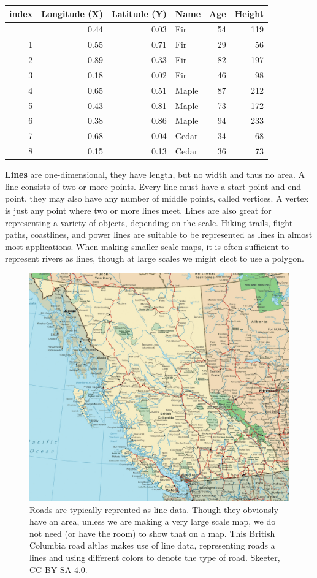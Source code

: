 \documentclass[
]{book}
\begin{document}
\begin{longtable}[]{@{}rrrlrr@{}}
\toprule\noalign{}
index & Longitude (X) & Latitude (Y) & Name & Age & Height \\
\midrule\noalign{}
\endhead
\bottomrule\noalign{}
\endlastfoot
0 & 0.44 & 0.03 & Fir & 54 & 119 \\
1 & 0.55 & 0.71 & Fir & 29 & 56 \\
2 & 0.89 & 0.33 & Fir & 82 & 197 \\
3 & 0.18 & 0.02 & Fir & 46 & 98 \\
4 & 0.65 & 0.51 & Maple & 87 & 212 \\
5 & 0.43 & 0.81 & Maple & 73 & 172 \\
6 & 0.38 & 0.86 & Maple & 94 & 233 \\
7 & 0.68 & 0.04 & Cedar & 34 & 68 \\
8 & 0.15 & 0.13 & Cedar & 36 & 73 \\
\end{longtable}

\textbf{Lines} are one-dimensional, they have length, but no width and thus no area. A line consists of two or more points. Every line must have a start point and end point, they may also have any number of middle points, called vertices. A vertex is just any point where two or more lines meet. Lines are also great for representing a variety of objects, depending on the scale. Hiking trails, flight paths, coastlines, and power lines are suitable to be represented as lines in almost most applications. When making smaller scale maps, it is often sufficient to represent rivers as lines, though at large scales we might elect to use a polygon.

\begin{figure}
\includegraphics[width=0.75\linewidth]{images/03-bc-road-map} \caption{Roads are typically reprented as line data. Though they obviously have an area, unless we are making a very large scale map, we do not need (or have the room) to show that on a map. This British Columbia road altlas makes use of line data, representing roads a lines and using different colors to denote the type of road. Skeeter, CC-BY-SA-4.0.}\label{fig:3-bc-road-map}
\end{figure}
\end{document}
